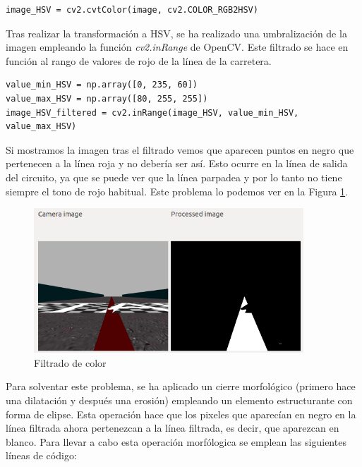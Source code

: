 \vspace{10pt}
\begin{lstlisting}
image_HSV = cv2.cvtColor(image, cv2.COLOR_RGB2HSV)
\end{lstlisting}
\vspace{20pt}


Tras realizar la transformación a HSV, se ha realizado una umbralización de la imagen empleando la función \textit{cv2.inRange} de OpenCV. Este filtrado se hace en función al rango de valores de rojo de la línea de la carretera.\\

\vspace{10pt}
\begin{lstlisting}
value_min_HSV = np.array([0, 235, 60])
value_max_HSV = np.array([80, 255, 255])
image_HSV_filtered = cv2.inRange(image_HSV, value_min_HSV, value_max_HSV)
\end{lstlisting}
\vspace{20pt}


Si mostramos la imagen tras el filtrado vemos que aparecen puntos en negro que pertenecen a la línea roja y no debería ser así. Esto ocurre en la línea de salida del circuito, ya que se puede ver que la línea parpadea y por lo tanto no tiene siempre el tono de rojo habitual. Este problema lo podemos ver en la Figura \ref{fig.color}.\\

\begin{figure}[H]
  \begin{center}
    \includegraphics[width=0.9\textwidth]{figures/Infraestructura/filtro_color.png}
		\caption{Filtrado de color}
		\label{fig.color}
		\end{center}
\end{figure}

Para solventar este problema, se ha aplicado un cierre morfológico (primero hace una dilatación y después una erosión) empleando un elemento estructurante con forma de elipse. Esta operación hace que los pixeles que aparecían en negro en la línea filtrada ahora pertenezcan a la línea filtrada, es decir, que aparezcan en blanco. Para llevar a cabo esta operación morfólogica se emplean las siguientes líneas de código:\\

